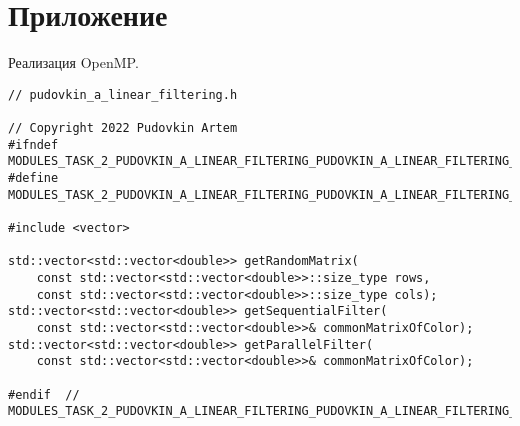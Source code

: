 \documentclass{report}
\begin{document}
\section*{Приложение}
Реализация OpenMP.
\begin{lstlisting}
// pudovkin_a_linear_filtering.h

// Copyright 2022 Pudovkin Artem
#ifndef MODULES_TASK_2_PUDOVKIN_A_LINEAR_FILTERING_PUDOVKIN_A_LINEAR_FILTERING_H_
#define MODULES_TASK_2_PUDOVKIN_A_LINEAR_FILTERING_PUDOVKIN_A_LINEAR_FILTERING_H_

#include <vector>

std::vector<std::vector<double>> getRandomMatrix(
    const std::vector<std::vector<double>>::size_type rows,
    const std::vector<std::vector<double>>::size_type cols);
std::vector<std::vector<double>> getSequentialFilter(
    const std::vector<std::vector<double>>& commonMatrixOfColor);
std::vector<std::vector<double>> getParallelFilter(
    const std::vector<std::vector<double>>& commonMatrixOfColor);

#endif  // MODULES_TASK_2_PUDOVKIN_A_LINEAR_FILTERING_PUDOVKIN_A_LINEAR_FILTERING_H_

\end{lstlisting}
\end{document}
